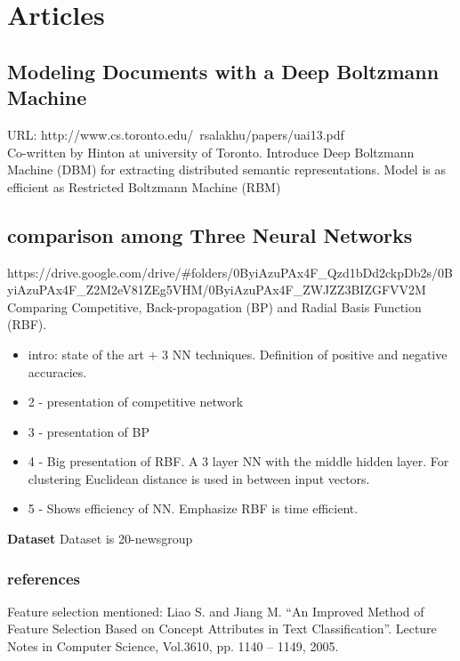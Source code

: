 	



\section{Articles}
	\subsection {Modeling Documents with a Deep Boltzmann Machine}
		URL: http://www.cs.toronto.edu/~rsalakhu/papers/uai13.pdf \\

		Co-written by Hinton at university of Toronto. Introduce Deep Boltzmann Machine (DBM) for extracting distributed semantic representations. Model is as efficient as Restricted Boltzmann Machine (RBM) 



	\subsection{comparison among Three Neural Networks} 
		https://drive.google.com/drive/\#folders/0ByiAzuPAx4F\_Qzd1bDd2ckpDb2s/0ByiAzuPAx4F\_Z2M2eV81ZEg5VHM/0ByiAzuPAx4F\_ZWJZZ3BIZGFVV2M \\

		Comparing Competitive, Back-propagation (BP) and Radial Basis Function (RBF). 
		\begin{itemize}
			\item intro: state of the art + 3 NN techniques. Definition of positive and negative accuracies.
			\item 2 - presentation of competitive network
			\item 3 - presentation of BP
			\item 4 - Big presentation of RBF. A 3 layer NN with the middle hidden layer. For clustering Euclidean distance is used in between input vectors. 
			\item 5 - Shows efficiency of NN. Emphasize RBF is time efficient.
		\end{itemize}

		\textbf{Dataset}
		Dataset is 20-newsgroup

		\subsubsection{references}
		Feature selection mentioned: Liao S. and Jiang M. “An Improved Method of Feature Selection Based on Concept Attributes in Text Classification”. Lecture Notes in Computer Science, Vol.3610, pp. 1140 – 1149, 2005.

